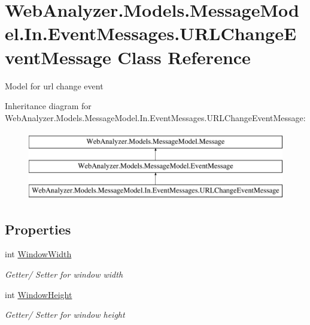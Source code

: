 \hypertarget{class_web_analyzer_1_1_models_1_1_message_model_1_1_in_1_1_event_messages_1_1_u_r_l_change_event_message}{}\section{Web\+Analyzer.\+Models.\+Message\+Model.\+In.\+Event\+Messages.\+U\+R\+L\+Change\+Event\+Message Class Reference}
\label{class_web_analyzer_1_1_models_1_1_message_model_1_1_in_1_1_event_messages_1_1_u_r_l_change_event_message}


Model for url change event  


Inheritance diagram for Web\+Analyzer.\+Models.\+Message\+Model.\+In.\+Event\+Messages.\+U\+R\+L\+Change\+Event\+Message\+:\begin{figure}[H]
\begin{center}
\leavevmode
\includegraphics[height=3.000000cm]{class_web_analyzer_1_1_models_1_1_message_model_1_1_in_1_1_event_messages_1_1_u_r_l_change_event_message}
\end{center}
\end{figure}
\subsection*{Properties}
\begin{DoxyCompactItemize}
\item 
int \hyperlink{class_web_analyzer_1_1_models_1_1_message_model_1_1_in_1_1_event_messages_1_1_u_r_l_change_event_message_abd2bd1ae084ffc2aecf7daf1f50c5b77}{Window\+Width}
\begin{DoxyCompactList}\small\item\em Getter/ Setter for window width \end{DoxyCompactList}\item 
int \hyperlink{class_web_analyzer_1_1_models_1_1_message_model_1_1_in_1_1_event_messages_1_1_u_r_l_change_event_message_a38465c15df5836ce5f4852a6e749a9fd}{Window\+Height}
\begin{DoxyCompactList}\small\item\em Getter/ Setter for window height \end{DoxyCompactList}\end{DoxyCompactItemize}
